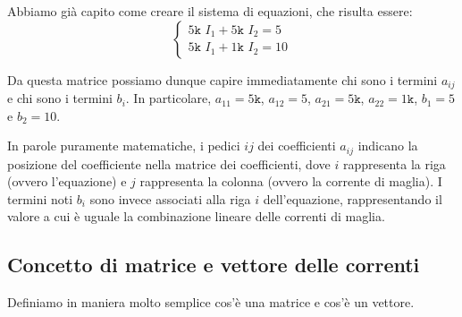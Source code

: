 \begin{center}
\end{center}


Abbiamo già capito come creare il sistema di equazioni, che risulta essere: 
\begin{equation}
    \begin{cases}
        5 \texttt{k} \,\,I_1 + 5\texttt{k} \,\,I_2 = 5 \\
        5 \texttt{k} \,\,I_1 + 1\texttt{k} \,\,I_2 = 10
    \end{cases}
	\label{eq:gauss-jordan}
\end{equation}

Da questa matrice possiamo dunque capire immediatamente chi sono i termini $a_{ij}$ e chi sono i termini $b_i$. In particolare, $a_{11} = 5\texttt{k}$, $a_{12} = 5$, $a_{21} = 5\texttt{k}$, $a_{22} = 1\texttt{k}$, $b_1 = 5$ e $b_2 = 10$.

In parole puramente matematiche, i pedici $ij$ dei coefficienti $a_{ij}$ indicano la posizione del coefficiente nella matrice dei coefficienti, dove $i$ rappresenta la riga (ovvero l’equazione) e $j$ rappresenta la colonna (ovvero la corrente di maglia). I termini noti $b_i$ sono invece associati alla riga $i$ dell’equazione, rappresentando il valore a cui è uguale la combinazione lineare delle correnti di maglia.




\subsection{Concetto di matrice e vettore delle correnti}
Definiamo in maniera molto semplice cos’è una matrice e cos’è un vettore. 

